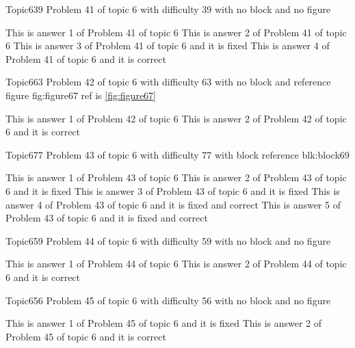 \documentclass[master]{exam}
\begin{document}
\begin{problem}{Topic6}{39}
	Problem 41 of topic 6 with difficulty 39 with no block and no figure
	\begin{answers}
		\answer This is answer 1 of Problem 41 of topic 6 
		\answer This is answer 2 of Problem 41 of topic 6 
		\answer[fixed] This is answer 3 of Problem 41 of topic 6 and it is fixed
		\answer[correct] This is answer 4 of Problem 41 of topic 6 and it is correct
	\end{answers}
\end{problem}

\begin{problem}{Topic6}{63}
	Problem 42 of topic 6 with difficulty 63 with no block and reference figure fig:figure67 ref is \ref{fig:figure67}
	\begin{answers}
		\answer This is answer 1 of Problem 42 of topic 6 
		\answer[correct] This is answer 2 of Problem 42 of topic 6 and it is correct
	\end{answers}
\end{problem}

\begin{problem}[requires=blk:block69]{Topic6}{77}
	Problem 43 of topic 6 with difficulty 77 with block reference blk:block69
	\begin{answers}
		\answer This is answer 1 of Problem 43 of topic 6 
		\answer[fixed] This is answer 2 of Problem 43 of topic 6 and it is fixed
		\answer[fixed] This is answer 3 of Problem 43 of topic 6 and it is fixed
		 This is answer 4 of Problem 43 of topic 6 and it is fixed and correct
		 This is answer 5 of Problem 43 of topic 6 and it is fixed and correct
	\end{answers}
\end{problem}

\begin{problem}{Topic6}{59}
	Problem 44 of topic 6 with difficulty 59 with no block and no figure
	\begin{answers}
		\answer This is answer 1 of Problem 44 of topic 6 
		\answer[correct] This is answer 2 of Problem 44 of topic 6 and it is correct
	\end{answers}
\end{problem}

\begin{problem}{Topic6}{56}
	Problem 45 of topic 6 with difficulty 56 with no block and no figure
	\begin{answers}
		\answer[fixed] This is answer 1 of Problem 45 of topic 6 and it is fixed
		\answer[correct] This is answer 2 of Problem 45 of topic 6 and it is correct
	\end{answers}
\end{problem}
\end{document}
